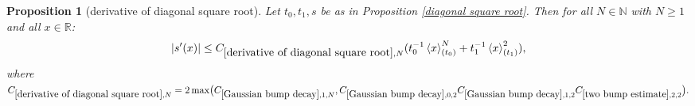 \documentclass[12pt,reqno]{amsart}
\theoremstyle{plain}
\newtheorem{proposition}[theorem]{Proposition}
\numberwithin{equation}{section}
\theoremstyle{remark}
\newcommand{\using}[1]{}
\newcommand{\R}{{\mathbb R}}
\newcommand{\N}{{\mathbb N}}
\begin{document}
\begin{proposition}[derivative of diagonal square root]\label{derivative of diagonal square root}\using{square root of Gaussian decay}\using{Elementary Gaussian properties}\using{Gaussian bump decay}\using{two bump estimate}
Let $t_0,t_1,s$ be as in Proposition \ref{diagonal square root}.
Then for all $N\in\N$ with $N\ge1$ and all $x\in\R$:
\begin{equation}\label{E:s-derivative-estimate}
    |s'(x)|\le  C_{\ref{derivative of diagonal square root},N} ( t_0^{-1} \left<x\right>^N_{(t_0)}+ t_1^{-1}\left<x\right>^2_{(t_1)}),
\end{equation}
where
$C_{\ref{derivative of diagonal square root},N}
=
2\max\bigl(
C_{\ref{Gaussian bump decay},1,N},
C_{\ref{Gaussian bump decay},0,2}
C_{\ref{Gaussian bump decay},1,2}
C_{\ref{two bump estimate},2,2}
\bigr).$
\end{proposition}
\end{document}
